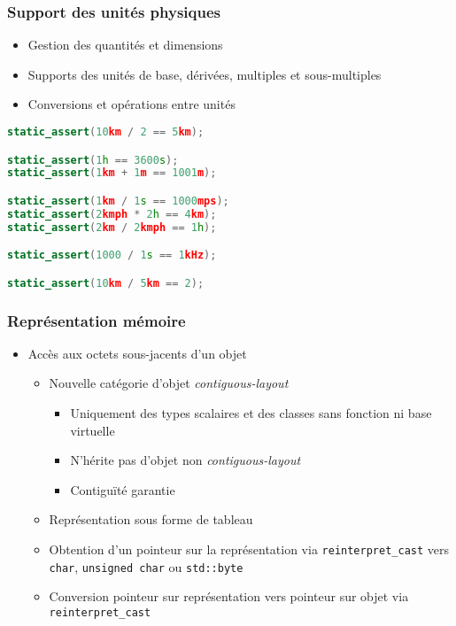 \documentclass[C++.tex]{subfiles}
\begin{document}
\begin{frame}[fragile]
	\frametitle{Support des unités physiques}
	\begin{itemize}
		\item Gestion des quantités et dimensions
		\item Supports des unités de base, dérivées, multiples et sous-multiples
		\item Conversions et opérations entre unités
	\end{itemize}

	\begin{lstlisting}[language=C++]
static_assert(10km / 2 == 5km);

static_assert(1h == 3600s);
static_assert(1km + 1m == 1001m);

static_assert(1km / 1s == 1000mps);
static_assert(2kmph * 2h == 4km);
static_assert(2km / 2kmph == 1h);

static_assert(1000 / 1s == 1kHz);

static_assert(10km / 5km == 2);\end{lstlisting}
\end{frame}

\begin{frame}[fragile]
	\frametitle{Représentation mémoire}
	\begin{itemize}
		\item Accès aux octets sous-jacents d'un objet
		\begin{itemize}
			\item Nouvelle catégorie d'objet \textit{contiguous-layout}
			\begin{itemize}
				\item Uniquement des types scalaires et des classes sans fonction ni base virtuelle
				\item N'hérite pas d'objet non \textit{contiguous-layout}
				\item Contiguïté garantie
			\end{itemize}
			\item Représentation sous forme de tableau
			\item Obtention d'un pointeur sur la représentation via \lstinline|reinterpret_cast| vers \lstinline|char|, \lstinline|unsigned char| ou \lstinline|std::byte|
			\item Conversion pointeur sur représentation vers pointeur sur objet via \lstinline|reinterpret_cast|
		\end{itemize}
	\end{itemize}
\end{frame}
\end{document}
